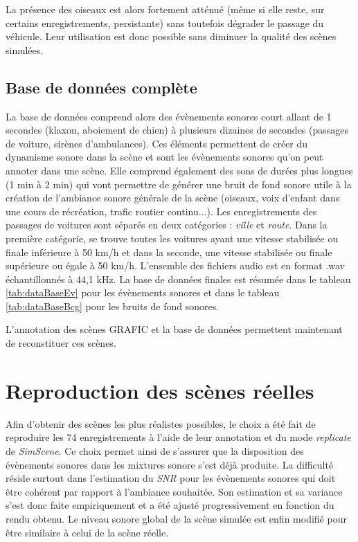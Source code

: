 La présence des oiseaux est alors fortement atténué (même si elle reste, sur certains enregistrements, persistante) sans toutefois dégrader le passage du véhicule. Leur utilisation est donc possible sans diminuer la qualité des scènes simulées.\\

\subsection{Base de données complète}
La base de données comprend alors des évènements sonores court allant de 1 secondes (klaxon, aboiement de chien) à plusieurs dizaines de secondes (passages de voiture, sirènes d'ambulances). Ces éléments permettent de créer du dynamisme sonore dans la scène et sont les évènements sonores qu'on peut annoter dans une scène. Elle comprend également des sons de durées plus longues (1 min à 2 min) qui vont permettre de générer une bruit de fond sonore utile à la création de l'ambiance sonore générale de la scène (oiseaux, voix d'enfant dans une cours de récréation, trafic routier continu...). Les enregistrements des passages de voitures sont séparés en deux catégories : \textit{ville} et \textit{route}. Dans la première catégorie, se trouve toutes les voitures ayant une vitesse stabilisée ou finale inférieure à 50 km/h et dans la seconde, une vitesse stabilisée ou finale supérieure ou égale à 50 km/h. L'ensemble des fichiers audio est en format .wav échantillonnés à 44,1 kHz. La base de données finales est résumée dans le tableau \ref{tab:dataBaseEv} pour les évènements sonores et dans le tableau \ref{tab:dataBaseBcg} pour les bruits de fond sonores. 



L'annotation des scènes GRAFIC et la base de données permettent maintenant de reconstituer ces scènes.

\section{Reproduction des scènes réelles}

Afin d'obtenir des scènes les plus réalistes possibles, le choix a été fait de reproduire les 74 enregistrements à l'aide de leur annotation et du mode \textit{replicate} de \textit{SimScene}. Ce choix permet ainsi de s'assurer que la disposition des évènements sonores dans les mixtures sonore s'est déjà produite. La difficulté réside surtout dans l'estimation du \textit{SNR} pour les évènements sonores qui doit être cohérent par rapport à l'ambiance souhaitée. Son estimation et sa variance s'est donc faite empiriquement et a été ajusté progressivement en fonction du rendu obtenu. Le niveau sonore global de la scène simulée est enfin modifié pour être similaire à celui de la scène réelle.\\

